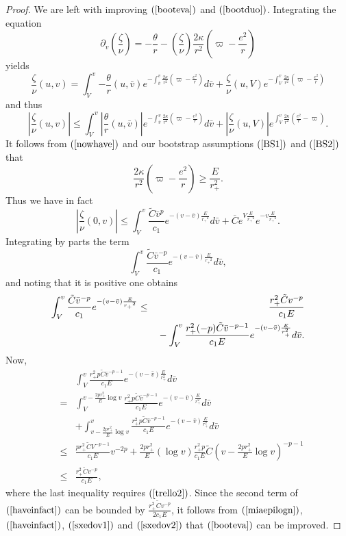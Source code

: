 \documentclass{article}
\begin{document}
{\begin{proof}
We are left with improving $(\ref{booteva})$
and $(\ref{bootduo})$.
Integrating the equation
\begin{equation}
\label{integrating}
\partial_v\left(\frac\zeta\nu\right)=
-\frac\theta{r}-\left(\frac\zeta\nu\right)\frac{2\kappa}{r^2}
\left(\varpi-\frac{e^2}r\right)
\end{equation}
yields
\[
\frac\zeta\nu(u,v)=
\int_V^v{-\frac{\theta}r(u,\bar{v})e^{-\int_{\bar{v}}^v{
\frac{2\kappa}{r^2}\left(\varpi-\frac{e^2}r\right)}}d\bar{v}}+
\frac\zeta\nu(u,V)e^{-\int_V^v{\frac{2\kappa}{r^2}\left(
\varpi-\frac{e^2}r\right)}}
\]
and thus
\[
\left|\frac\zeta\nu(u,v)\right|
\le
\int_V^v{\left|\frac{\theta}r(u,\bar{v})\right|e^{-\int_{\bar{v}}^v{
\frac{2\kappa}{r^2}\left(\varpi-\frac{e^2}r\right)}}d\bar{v}}
+
\left|\frac\zeta\nu(u,V)\right|
e^{\int_V^v{\frac{2\kappa}{r^2}\left(
\frac{e^2}r-\varpi\right)}}.
\]
It follows from $(\ref{nowhave})$ and our bootstrap assumptions
$(\ref{BS1})$ and $(\ref{BS2})$ that
\begin{equation}
\label{cokmuhim}
\frac{2\kappa}{r^2}\left(\varpi-\frac{e^2}r\right)
\ge
\frac{E}{r_+^2}.
\end{equation}
Thus we have in fact
\begin{equation}
\label{haveinfact}
\left|\frac\zeta\nu(0,v)\right|
\le
\int_V^v{\frac{\tilde{C}\bar{v}^p}{c_1}e^{-(v-\bar{v})\frac{E}{{r_+}^2}}
d\bar{v}}
+
\overline{C}e^{V\frac{E}{{r_+}^2}}e^{-v\frac{E}{{r_+}^2}}.
\end{equation}
Integrating by parts the term
\[
\int_V^v{\frac{\tilde{C}\bar{v}^{-p}}{c_1}e^{-(v-\bar{v})\frac{E}{{r_+}^2}}
d\bar{v}},
\]
and noting that it is positive one obtains
\begin{eqnarray}
\label{sxedov1}
\nonumber
\int_V^v{\frac{\tilde{C}\bar{v}^{-p}}{c_1}e^{-(v-\bar{v})\frac{E}{{r_+}^2}}
}
&\le&
\frac{r_+^2\tilde{C}v^{-p}}{c_1E}\\
&&\hbox{}-
\int_V^v{\frac{r_+^2(-p)\tilde{C}\bar{v}^{-p-1}}{c_1E}
e^{-(v-\bar{v})\frac E{r_+^2}}d\bar{v}}.
\end{eqnarray}
Now,
\begin{eqnarray}
\label{sxedov2}
\nonumber
&&\int_V^v{\frac{r_+^2p\tilde{C}\bar{v}^{-p-1}}{c_1E}
e^{-(v-\bar{v})\frac{E}{r_+^2}}d\bar{v}}
\\
\nonumber
&=&\int_V^{v-\frac{2pr_+^2}{E}\log v}
{\frac{r_+^2p\tilde{C}\bar{v}^{-p-1}}{c_1E}
e^{-(v-\bar{v})\frac{E}{r_+^2}}d\bar{v}}\\
\nonumber
&&+\int_{v-\frac{2pr_+^2}{E}\log v}^v
{\frac{r_+^2p\tilde{C}\bar{v}^{-p-1}}{c_1E}
e^{-(v-\bar{v})\frac{E}{r_+^2}}d\bar{v}}\\
\nonumber
&\le&\frac{pr_+^2\tilde{C}V^{-p-1}}{c_1E} v^{-2p}
+\frac{2pr_+^2}{E}(\log v)\frac{r_+^2p}{c_1E}\tilde{C}(
v-\frac{2pr_+^2}{E}\log v)^{-p-1}\\
&\le&\frac{r_+^2\tilde{C}v^{-p}}{c_1E},
\end{eqnarray}
where the last inequality requires $(\ref{trello2})$.
Since the second term of $(\ref{haveinfact})$
can be bounded by $\frac{r_+^2\tilde{C}v^{-p}}{2c_1E}$,
it follows from $(\ref{miaepilogn})$,
$(\ref{haveinfact})$, $(\ref{sxedov1})$ 
and $(\ref{sxedov2})$ that
$(\ref{booteva})$ can be improved.


\end{proof}}
\end{document}
